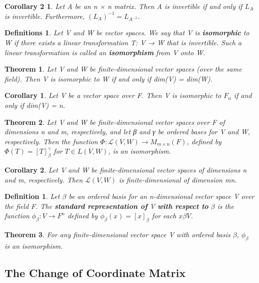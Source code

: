 \documentclass{article}
\newcommand{\bd}[1]{\textbf{#1}}
\theoremstyle{plain}
\newtheorem{theorem}{Theorem}[section]
\newtheorem*{corollary}{Corollary}
\newtheorem*{corollary2}{Corollary 2}
\newtheorem*{definition1}{Definition}
\newtheorem*{definitions}{Definitions}
\theoremstyle{plain} %
\begin{document}
\begin{corollary2}
Let A be an n × n matrix. Then A is invertible if and only if $L_A$ is invertible. Furthermore, $(L_A)^{-1} = L_{A^{-1}}$.
\end{corollary2}

\begin{definitions}
Let V and W be vector spaces. We say that V is \bd{isomorphic} to W if there exists a linear transformation T: V → W that is invertible. Such a linear transformation is called an \bd{isomorphism} from V onto W.
\end{definitions}

\begin{theorem}
Let V and W be finite-dimensional vector spaces (over the same field). Then V is isomorphic to W if and only if dim(V) = dim(W).
\end{theorem}

\begin{corollary}
Let V be a vector space over F. Then V is isomorphic to $F_n$ if and only if dim(V) = n.
\end{corollary}

\begin{theorem}
Let V and W be finite-dimensional vector spaces over F of dimensions n and m, respectively, and let β and γ be ordered bases for V and W, respectively. Then the function $\Phi: \mathcal L(V, W) → M_{m\times n}(F)$, defined by $\Phi(T)=[T]_\beta^\gamma$ for $T \in L(V, W)$, is an isomorphism.
\end{theorem}

\begin{corollary}
Let V and W be finite-dimensional vector spaces of dimensions n and m, respectively. Then $\mathcal L(V, W)$ is finite-dimensional of dimension mn.
\end{corollary}

\begin{definition1}
Let $\beta$ be an ordered basis for an n-dimensional vector space V over the field F. The \bd{standard representation of} V \bd{with respect to} $\beta$ is the function $\phi_\beta : V \to F^n$ defined by $\phi_\beta(x)=[x]_\beta$ for each $x \beta V$.
\end{definition1}

\begin{theorem}
For any finite-dimensional vector space V with ordered basis $\beta$, $\phi_\beta$ is an isomorphism.
\end{theorem}

\subsection{The Change of Coordinate Matrix}
\end{document}
